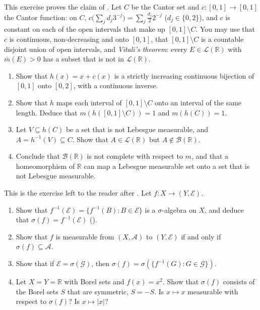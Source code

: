 \begin{exercise}\label{ex:mf-cantor-nonborel}
\hard This exercise proves the claim of . Let $C$ be the Cantor set and
$c:[0,1]\to[0,1]$ the Cantor function: on $C$,
$c\big(\sum_jd_j3^{-j}\big)=\sum_j\frac{d_j}22^{-j}$ ($d_j\in\{0,2\}$), and $c$ is constant on
each of the open intervals that make up $[0,1]\setminus C$. You may use that $c$ is continuous,
non-decreasing and onto $[0,1]$, that $[0,1]\setminus C$ is a countable disjoint union of open
intervals, and \emph{Vitali's theorem}: every $E\in\mathcal L(\mathbb R)$ with $\bar m(E)>0$ has a
subset that is not in $\mathcal L(\mathbb R)$.
\begin{enumerate}[label=(\alph*)]
  \item Show that $h(x)=x+c(x)$ is a strictly increasing continuous bijection of $[0,1]$ onto
    $[0,2]$, with a continuous inverse.
  \item Show that $h$ maps each interval of $[0,1]\setminus C$ onto an interval of the same
    length. Deduce that $m(h([0,1]\setminus C))=1$ and $m(h(C))=1$.
  \item Let $V\subseteq h(C)$ be a set that is not Lebesgue measurable, and
    $A=h^{-1}(V)\subseteq C$. Show that $A\in\mathcal L(\mathbb R)$ but $A\notin\mathcal B(\mathbb R)$.
  \item Conclude that $\mathcal B(\mathbb R)$ is not complete with respect to $m$, and that a
    homeomorphism of $\mathbb R$ can map a Lebesgue measurable set onto a set that is not
    Lebesgue measurable.
\end{enumerate}
\end{exercise}

\begin{exercise}\label{ex:mf-sigma-f}
\easy This is the exercise left to the reader after . Let
$f:X\to(Y,\mathcal E)$.
\begin{enumerate}[label=(\alph*)]
  \item Show that $f^{-1}(\mathcal E)=\{f^{-1}(B):B\in\mathcal E\}$ is a $\sigma$-algebra on $X$,
    and deduce that $\sigma(f)=f^{-1}(\mathcal E)$ ().
  \item Show that $f$ is measurable from $(X,\mathcal A)$ to $(Y,\mathcal E)$ if and only if
    $\sigma(f)\subseteq\mathcal A$.
  \item Show that if $\mathcal E=\sigma(\mathcal G)$, then
    $\sigma(f)=\sigma(\{f^{-1}(G):G\in\mathcal G\})$.
  \item Let $X=Y=\mathbb R$ with Borel sets and $f(x)=x^2$. Show that $\sigma(f)$ consists of
    the Borel sets $S$ that are symmetric, $S=-S$. Is $x\mapsto x$ measurable with respect to
    $\sigma(f)$? Is $x\mapsto|x|$?
\end{enumerate}
\end{exercise}


